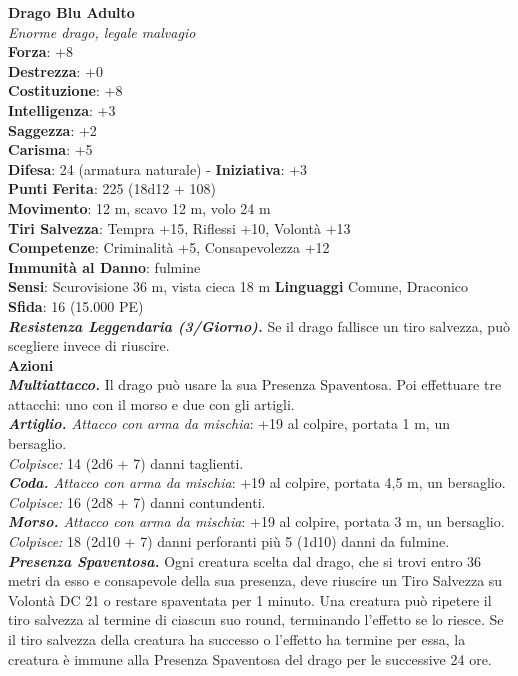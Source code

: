 \begin{multicols}{2}
\medskip\textbf{Drago Blu Adulto}\\
\emph{Enorme drago, legale malvagio}\\
\textbf{Forza}: +8\\
\textbf{Destrezza}: +0\\
\textbf{Costituzione}: +8\\
\textbf{Intelligenza}: +3\\
\textbf{Saggezza}: +2\\
\textbf{Carisma}: +5\\
\textbf{Difesa}: 24 (armatura naturale) - \textbf{Iniziativa}: +3\\
\textbf{Punti Ferita}: 225 (18d12 + 108)\\
\textbf{Movimento}: 12 m, scavo 12 m, volo 24 m\\
\textbf{Tiri Salvezza}: Tempra +15, Riflessi +10, Volontà +13\\
\textbf{Competenze}: Criminalità +5, Consapevolezza +12\\
\textbf{Immunità al Danno}: fulmine\\
\textbf{Sensi}: Scurovisione 36 m, vista cieca 18 m
\textbf{Linguaggi} Comune, Draconico\\
\textbf{Sfida}: 16 (15.000 PE)\smallskip\\
\emph{\textbf{Resistenza Leggendaria (3/Giorno).}} Se il drago fallisce un tiro salvezza, può scegliere invece di riuscire.\\
\smallskip\textbf{Azioni}\\
\emph{\textbf{Multiattacco.}} Il drago può usare la sua Presenza Spaventosa. Poi effettuare tre attacchi: uno con il morso e due con gli artigli.\\
\emph{\textbf{Artiglio.} Attacco con arma da mischia}: +19 al colpire, portata 1 m, un bersaglio.\\
\emph{Colpisce:} 14 (2d6 + 7) danni taglienti.\\
\emph{\textbf{Coda.} Attacco con arma da mischia}: +19 al colpire, portata 4,5 m, un bersaglio.\\
\emph{Colpisce:} 16 (2d8 + 7) danni contundenti.\\
\emph{\textbf{Morso.} Attacco con arma da mischia}: +19 al colpire, portata 3 m, un bersaglio.\\
\emph{Colpisce:} 18 (2d10 + 7) danni perforanti più 5 (1d10) danni da fulmine.\\
\emph{\textbf{Presenza Spaventosa.}} Ogni creatura scelta dal drago, che si trovi entro 36 metri da esso e consapevole della sua presenza, deve riuscire un Tiro Salvezza su Volontà DC  21 o restare spaventata per 1 minuto. Una creatura può ripetere il tiro salvezza al termine di ciascun suo round, terminando l'effetto se lo riesce. Se il tiro salvezza della creatura ha successo o l'effetto ha termine per essa, la creatura è immune alla Presenza Spaventosa del drago per le successive 24 ore.\\

\end{multicols}
